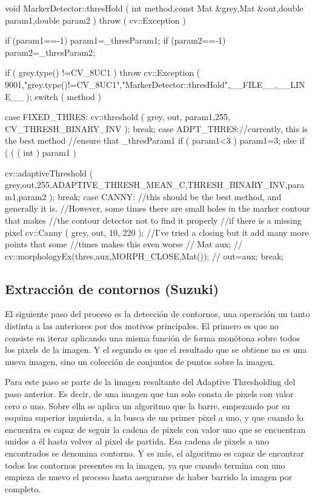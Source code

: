 \begin{listing}[style=C++]
void MarkerDetector::thresHold ( int method,const Mat &grey,Mat &out,double param1,double param2 ) throw ( cv::Exception )
{

    if (param1==-1) param1=_thresParam1;
    if (param2==-1) param2=_thresParam2;

    if ( grey.type() !=CV_8UC1 )     throw cv::Exception ( 9001,"grey.type()!=CV_8UC1","MarkerDetector::thresHold",__FILE__,__LINE__ );
    switch ( method )
    {
    case FIXED_THRES:
        cv::threshold ( grey, out, param1,255, CV_THRESH_BINARY_INV );
        break;
    case ADPT_THRES://currently, this is the best method
//ensure that _thresParam1%
        if ( param1<3 ) param1=3;
        else if ( ( ( int ) param1 ) %

        cv::adaptiveThreshold ( grey,out,255,ADAPTIVE_THRESH_MEAN_C,THRESH_BINARY_INV,param1,param2 );
        break;
    case CANNY:
    {
        //this should be the best method, and generally it is.
        //However, some times there are small holes in the marker contour that makes
        //the contour detector not to find it properly
        //if there is a missing pixel
        cv::Canny ( grey, out, 10, 220 );
        //I've tried a closing but it add many more points that some
        //times makes this even worse
// 			  Mat aux;
// 			  cv::morphologyEx(thres,aux,MORPH_CLOSE,Mat());
// 			  out=aux;
    }
    break;
    }
}
\end{listing}  
\subsection{Extracción de contornos (Suzuki)}
El siguiente paso del proceso es la detección de contornos, una operación un tanto distinta a las anteriores por dos motivos principales. El primero es que no consiste en iterar aplicando una misma función de forma monótona sobre todos los pixels de la imagen. Y el segundo es que el resultado que se obtiene no es una nueva imagen, sino un colección de conjuntos de puntos sobre la imagen.

Para este paso se parte de la imagen resultante del Adaptive Thresholding del paso anterior. Es decir, de una imagen que tan solo consta de pixels con valor cero o uno. Sobre ella se aplica un algoritmo que la barre, empezando por su esquina superior izquierda, a la busca de un primer pixel a uno, y que cuando lo encuentra es capaz de seguir la cadena de pixels con valor uno que se encuentran unidos a él hasta volver al pixel de partida. Esa cadena de pixels a uno encontrados se denomina contorno. Y es más, el algoritmo es capaz de encontrar todos los contornos presentes en la imagen, ya que cuando termina con uno empieza de nuevo el proceso hasta asegurarse de haber barrido la imagen por completo.

